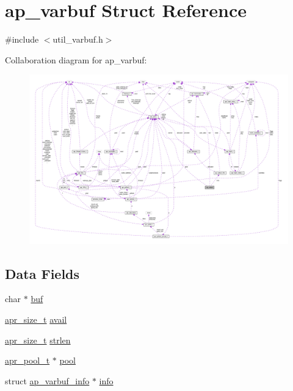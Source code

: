 \hypertarget{structap__varbuf}{}\section{ap\+\_\+varbuf Struct Reference}
\label{structap__varbuf}


{\ttfamily \#include $<$util\+\_\+varbuf.\+h$>$}



Collaboration diagram for ap\+\_\+varbuf\+:
\nopagebreak
\begin{figure}[H]
\begin{center}
\leavevmode
\includegraphics[width=350pt]{structap__varbuf__coll__graph}
\end{center}
\end{figure}
\subsection*{Data Fields}
\begin{DoxyCompactItemize}
\item 
char $\ast$ \hyperlink{structap__varbuf_a7877daf6c339eac8308a117fe0fcc112}{buf}
\item 
\hyperlink{group__apr__platform_gaaa72b2253f6f3032cefea5712a27540e}{apr\+\_\+size\+\_\+t} \hyperlink{structap__varbuf_a2a13c995fb5f9c15c677ff03df0f1ceb}{avail}
\item 
\hyperlink{group__apr__platform_gaaa72b2253f6f3032cefea5712a27540e}{apr\+\_\+size\+\_\+t} \hyperlink{structap__varbuf_a2d592128ff738e2d4d0c5f2afb0d2f83}{strlen}
\item 
\hyperlink{structapr__pool__t}{apr\+\_\+pool\+\_\+t} $\ast$ \hyperlink{structap__varbuf_a194c9dfb9bd169672dc081d655b4626f}{pool}
\item 
struct \hyperlink{structap__varbuf__info}{ap\+\_\+varbuf\+\_\+info} $\ast$ \hyperlink{structap__varbuf_ae5363fe8061898625080f8a4558890c5}{info}
\end{DoxyCompactItemize}



